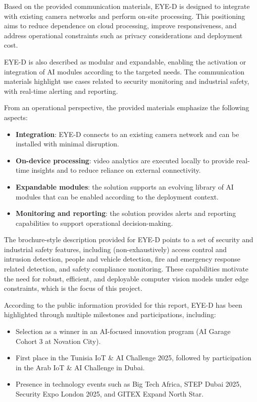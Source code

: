 Based on the provided communication materials, EYE-D is designed to integrate with existing camera networks and perform on-site processing. This positioning aims to reduce dependence on cloud processing, improve responsiveness, and address operational constraints such as privacy considerations and deployment cost.

EYE-D is also described as modular and expandable, enabling the activation or integration of AI modules according to the targeted needs. The communication materials highlight use cases related to security monitoring and industrial safety, with real-time alerting and reporting.

From an operational perspective, the provided materials emphasize the following aspects:
\begin{itemize}
  \item \textbf{Integration}: EYE-D connects to an existing camera network and can be installed with minimal disruption.
  \item \textbf{On-device processing}: video analytics are executed locally to provide real-time insights and to reduce reliance on external connectivity.
  \item \textbf{Expandable modules}: the solution supports an evolving library of AI modules that can be enabled according to the deployment context.
  \item \textbf{Monitoring and reporting}: the solution provides alerts and reporting capabilities to support operational decision-making.
\end{itemize}

The brochure-style description provided for EYE-D points to a set of security and industrial safety features, including (non-exhaustively) access control and intrusion detection, people and vehicle detection, fire and emergency response related detection, and safety compliance monitoring. These capabilities motivate the need for robust, efficient, and deployable computer vision models under edge constraints, which is the focus of this project.

According to the public information provided for this report, EYE-D has been highlighted through multiple milestones and participations, including:
\begin{itemize}
  \item Selection as a winner in an AI-focused innovation program (AI Garage Cohort 3 at Novation City).
  \item First place in the Tunisia IoT \& AI Challenge 2025, followed by participation in the Arab IoT \& AI Challenge in Dubai.
  \item Presence in technology events such as Big Tech Africa, STEP Dubai 2025, Security Expo London 2025, and GITEX Expand North Star.
\end{itemize}

